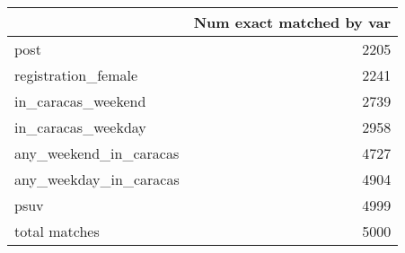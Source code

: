 \begin{tabular}{lr}
\toprule
{} &  Num exact matched by var \\
\midrule
post                   &                      2205 \\
registration\_female    &                      2241 \\
in\_caracas\_weekend     &                      2739 \\
in\_caracas\_weekday     &                      2958 \\
any\_weekend\_in\_caracas &                      4727 \\
any\_weekday\_in\_caracas &                      4904 \\
psuv                   &                      4999 \\
total matches          &                      5000 \\
\bottomrule
\end{tabular}
